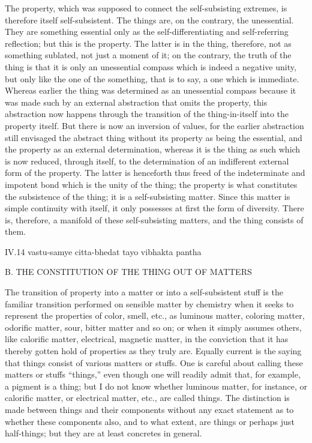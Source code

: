 The property, which was supposed to connect
the self-subsisting extremes,
is therefore itself self-subsistent.
The things are, on the contrary, the unessential.
They are something essential only as
the self-differentiating
and self-referring reflection;
but this is the property.
The latter is in the thing,
therefore, not as something sublated,
not just a moment of it;
on the contrary, the truth of the thing is
that it is only an unessential compass
which is indeed a negative unity,
but only like the one of the something,
that is to say, a one which is immediate.
Whereas earlier the thing was determined as
an unessential compass because it was made such
by an external abstraction that omits the property,
this abstraction now happens through the transition of
the thing-in-itself into the property itself.
But there is now an inversion of values,
for the earlier abstraction still envisaged
the abstract thing without its property
as being the essential,
and the property as an external determination,
whereas it is the thing as such which is now reduced,
through itself, to the determination of
an indifferent external form of the property.
The latter is henceforth thus freed of
the indeterminate and impotent bond
which is the unity of the thing;
the property is what constitutes
the subsistence of the thing;
it is a self-subsisting matter.
Since this matter is simple continuity with itself,
it only possesses at first the form of diversity.
There is, therefore, a manifold of
these self-subsisting matters,
and the thing consists of them.

IV.14
vastu-samye citta-bhedat tayo vibhakta pantha

B. THE CONSTITUTION OF THE THING OUT OF MATTERS

The transition of property into a matter
or into a self-subsistent stuff is the familiar
transition performed on sensible matter by chemistry
when it seeks to represent the properties of color, smell, etc.,
as luminous matter, coloring matter, odorific matter,
sour, bitter matter and so on;
or when it simply assumes others,
like calorific matter, electrical, magnetic matter,
in the conviction that it has thereby gotten hold
of properties as they truly are.
Equally current is the saying that
things consist of various matters or stuffs.
One is careful about calling these matters or stuffs “things,”
even though one will readily admit that,
for example, a pigment is a thing;
but I do not know whether luminous matter,
for instance, or calorific matter,
or electrical matter, etc., are called things.
The distinction is made between things and their components
without any exact statement as to whether these components also,
and to what extent, are things or perhaps just half-things;
but they are at least concretes in general.

